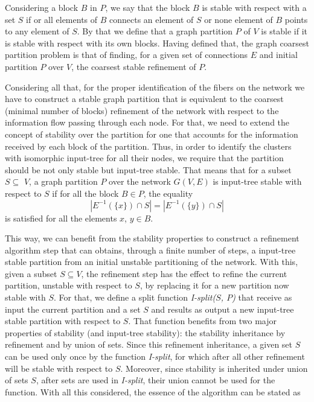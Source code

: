 \documentclass[12pt]{diazessay} %
\begin{document}
Considering a block $B$ in $P$, we say that the block $B$ is stable with respect with a set $S$ if or all elements of $B$ connects an element of $S$ or none element of $B$ points to any element of $S$. By that we define that a graph partition $P$ of $V$ is stable if it is stable with respect with its own blocks. Having defined that, the graph coarsest partition problem is that of finding, for a given set of connections $E$ and initial partition $P$ over $V$, the coarsest stable refinement of $P$. 

Considering all that, for the proper identification of the fibers on the network we have to construct a stable graph partition that is equivalent to the coarsest (minimal number of blocks) refinement of the network with respect to the information flow passing through each node. For that, we need to extend the concept of stability over the partition for one that accounts for the information received by each block of the partition. Thus, in order to identify the clusters with isomorphic input-tree for all their nodes, we require that the partition should be not only stable but input-tree stable. That means that for a subset $S \subseteq$ $V$, a graph partition $P$ over the network $G(V, E)$ is input-tree stable with respect to $S$ if for all the block $B \in P$, the equality
\begin{equation}
	| E^{-1}(\{x\}) \cap S | = | E^{-1}(\{y\}) \cap S |
\end{equation}
is satisfied for all the elements $x$, $y \in B$.

This way, we can benefit from the stability properties \cite{Tarjan1987} to construct a refinement algorithm step that can obtains, through a finite number of steps, a input-tree stable partition from an initial unstable partitioning of the network. With this, given a subset $S \subseteq V$, the refinement step has the effect to refine the current partition, unstable with respect to $S$, by replacing it for a new partition now stable with $S$. For that, we define a split function \textit{I-split($S$, $P$)} that receive as input the current partition and a set $S$ and results as output a new input-tree stable partition with respect to $S$. That function benefits from two major properties of stability (and input-tree stability): the stability inheritance by refinement and by union of sets. Since this refinement inheritance, a given set $S$ can be used only once by the function \textit{I-split}, for which after all other refinement will be stable with respect to $S$. Moreover, since stability is inherited under union of sets $S$, after sets are used in \textit{I-split}, their union cannot be used for the function. With all this considered, the essence of the algorithm can be stated as
\end{document}
